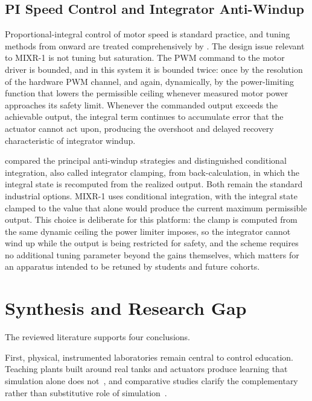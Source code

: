 \subsection{PI Speed Control and Integrator Anti-Windup}
\label{subsec:rrl-pi}

Proportional-integral control of motor speed is standard practice, and tuning methods from \citet{Ziegler1942} onward are treated comprehensively by \citet{astromhagglund2006}. The design issue relevant to MIXR-1 is not tuning but saturation. The PWM command to the motor driver is bounded, and in this system it is bounded twice: once by the resolution of the hardware PWM channel, and again, dynamically, by the power-limiting function that lowers the permissible ceiling whenever measured motor power approaches its safety limit. Whenever the commanded output exceeds the achievable output, the integral term continues to accumulate error that the actuator cannot act upon, producing the overshoot and delayed recovery characteristic of integrator windup.

\citet{bohn1995} compared the principal anti-windup strategies and distinguished conditional integration, also called integrator clamping, from back-calculation, in which the integral state is recomputed from the realized output. Both remain the standard industrial options. MIXR-1 uses conditional integration, with the integral state clamped to the value that alone would produce the current maximum permissible output. This choice is deliberate for this platform: the clamp is computed from the same dynamic ceiling the power limiter imposes, so the integrator cannot wind up while the output is being restricted for safety, and the scheme requires no additional tuning parameter beyond the gains themselves, which matters for an apparatus intended to be retuned by students and future cohorts.


\section{Synthesis and Research Gap}
\label{sec:rrl-synthesis}

The reviewed literature supports four conclusions.

First, physical, instrumented laboratories remain central to control education. Teaching plants built around real tanks and actuators produce learning that simulation alone does not~\citep{astrom1985,saco2002}, and comparative studies clarify the complementary rather than substitutive role of simulation~\citep{ma2006,zhang2013,abdulwahed2009}.

